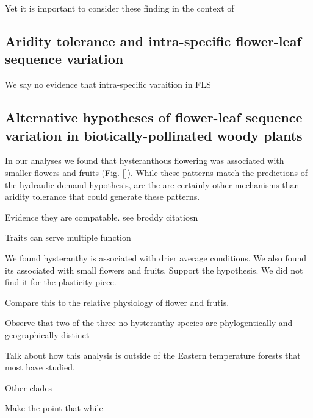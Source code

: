 \documentclass{article}[11pt]
\begin{document}
Yet it is important to consider these finding in the context of




\subsection*{Aridity tolerance and intra-specific flower-leaf sequence variation}
We say no evidence that intra-specific varaition in FLS

\subsection*{Alternative hypotheses of flower-leaf sequence variation in biotically-pollinated woody plants}

In our analyses we found that hysteranthous flowering was associated with smaller flowers and fruits (Fig. \ref{}). While these patterns match the predictions of the hydraulic demand hypothesis, are the are certainly other mechanisms than aridity tolerance that could generate these patterns. 

Evidence they are compatable. see broddy citatiosn

Traits can serve multiple function


We found hysteranthy is associated with drier average conditions. We also found its associated with small flowers and fruits. Support the hypothesis.
We did not find it for the plasticity piece.

Compare this to the relative physiology of flower and frutis.

Observe that two of the three no hysteranthy species are phylogentically and geographically distinct

Talk about how this analysis is outside of the Eastern temperature forests that most have studied. 

Other clades

Make the point that while
\end{document}
